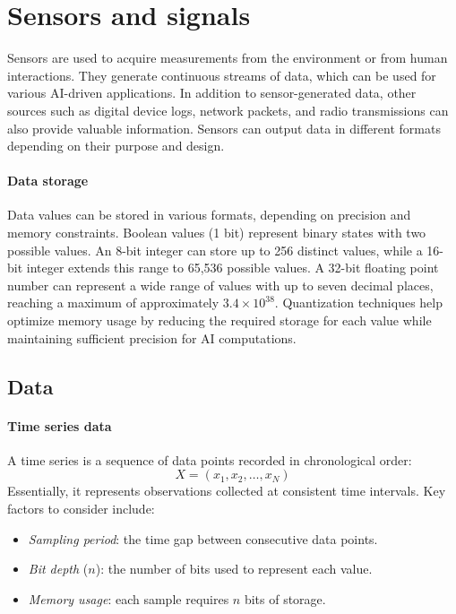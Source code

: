 \section{Sensors and signals}

Sensors are used to acquire measurements from the environment or from human interactions. 
They generate continuous streams of data, which can be used for various AI-driven applications. 
In addition to sensor-generated data, other sources such as digital device logs, network packets, and radio transmissions can also provide valuable information. 
Sensors can output data in different formats depending on their purpose and design.

\paragraph*{Data storage}
Data values can be stored in various formats, depending on precision and memory constraints. 
Boolean values (1 bit) represent binary states with two possible values. 
An 8-bit integer can store up to 256 distinct values, while a 16-bit integer extends this range to 65,536 possible values. 
A 32-bit floating point number can represent a wide range of values with up to seven decimal places, reaching a maximum of approximately $3.4\times 10^{38}$.
Quantization techniques help optimize memory usage by reducing the required storage for each value while maintaining sufficient precision for AI computations.

\subsection{Data}
\paragraph*{Time series data}
A time series is a sequence of data points recorded in chronological order:
\[X=(x_1,x_2,\dots,x_N)\] 
\noindent Essentially, it represents observations collected at consistent time intervals.
Key factors to consider include:
\begin{itemize}
    \item \textit{Sampling period}: the time gap between consecutive data points.
    \item \textit{Bit depth} ($n$): the number of bits used to represent each value.
    \item \textit{Memory usage}: each sample requires $n$ bits of storage.
\end{itemize}

